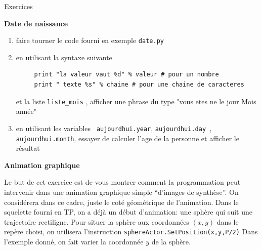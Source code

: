 \documentclass[12pt]{letter}
\begin{document}
\begin{center}
{\Large Exercices  }
\end{center}

\textbf{Date de naissance}
\begin{enumerate}
   \item faire tourner le code fourni en exemple \texttt{date.py}
   \item en utilisant la syntaxe suivante
   \begin{lstlisting}
     print "la valeur vaut %d" % valeur # pour un nombre
     print " texte %s" % chaine # pour une chaine de caracteres
   \end{lstlisting}
   et la liste \texttt{liste\_mois} , afficher une phrase du type "vous etes ne le jour Mois année"
  \item en utilisant les variables \texttt{ aujourdhui.year}, \texttt{aujourdhui.day }, \texttt{aujourdhui.month}, essayer
  de calculer l'age de la personne et afficher le résultat
\end{enumerate}

\textbf{Animation graphique}

 Le but de cet exercice est de vous montrer comment la programmation peut intervenir dans une animation graphique simple ``d'images de synthèse''.
 On considérera dans ce cadre, juste le coté géométrique de l'animation. Dans le squelette fourni en TP, on a déjà un début d'animation: 
 une sphère qui suit une trajectoire rectiligne. 
 Pour situer la sphère aux coordonnées $(x,y)$ dans le repère choisi, on utilisera l'instruction \texttt{sphereActor.SetPosition(x,y,P/2)}
 Dans l'exemple donné, on fait varier la coordonnée $y$ de la sphère. 
\end{document}
